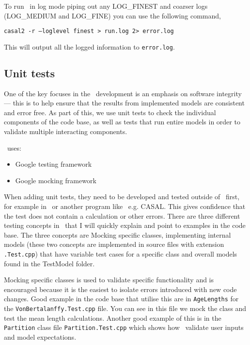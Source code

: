 To run \CNAME\ in log mode piping out any LOG\_FINEST and coarser logs (LOG\_MEDIUM and LOG\_FINE) you can use the following command,

\texttt{casal2 -r --loglevel finest > run.log 2> error.log}

This will output all the logged information to \texttt{error.log}.

\subsection{Unit tests}

One of the key focuses in the \CNAME\ development is an emphasis on software integrity --- this is to help ensure that the results from implemented models are consistent and error free. As part of this, we use unit tests to check the individual components of the code base, as well as tests that run entire models in order to validate multiple interacting components.

\CNAME\ uses:
\begin{itemize}
	\item Google testing framework
	\item Google mocking framework
\end{itemize}

When adding unit tests, they need to be developed and tested outside of \CNAME\  first, for example in \R\ or another program like \CNAME\ e.g. CASAL. This gives confidence that the test does not contain a calculation or other errors. There are three different testing concepts in \CNAME\ that I will quickly explain and point to examples in the code base. The three concepts are Mocking specific classes, implementing internal models (these two concepts are implemented in source files with extension \texttt{.Test.cpp}) that have variable test cases for a specific class and overall models found in the TestModel folder.

Mocking specific classes is used to validate specific functionality and is encouraged because it is the easiest to isolate errors introduced with new code changes. Good example in the code base that utilise this are in \texttt{AgeLengths} for the \texttt{VonBertalanffy.Test.cpp} file. You can see in this file we mock the class and test the mean length calculations. Another good example of this is in the \texttt{Partition} class file \texttt{Partition.Test.cpp} which shows how \CNAME\ validate user inputs and model expectations.

